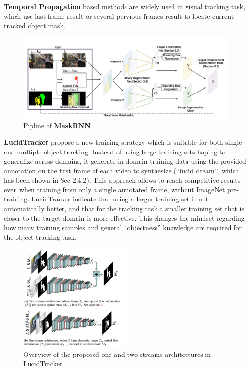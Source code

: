 \textbf{Temporal Propagation} based methods are widely used in visual tracking task\cite{LucidTracker}\cite{CTN}\cite{MaskRNN}, which use last frame result or several pervious frames result to locate current tracked object mask.


\begin{figure}[ht]
    \centering
    \includegraphics[width=\textwidth]{./figure/MaskRNN.png}
    \caption{Pipline of \textbf{MaskRNN}}
    \label{MaskRNN}
\end{figure}


\textbf{LucidTracker}\cite{LucidTracker} propose a new training strategy which is suitable for both single and multiple object tracking. Instead of using large training sets hoping to generalize across domains, it generate in-domain training data using the provided annotation on the first frame of each video to synthesize (``lucid dream'', which has been shown in Sec 2.4.2). This approach allows to reach competitive results even when training from only a single annotated frame, without ImageNet pre-training. LucidTracker indicate that using a larger training set is not automatically better, and that for the tracking task a smaller training set that is closer to the target domain is more effective. This changes the mindset regarding how many training samples and general ``objectness'' knowledge are required for the object tracking task.

\begin{figure}[ht]
    \centering
    \includegraphics[width=0.5\textwidth]{./figure/lucid_tracker.png}
    \caption{Overview of the proposed one and two streams architectures in LucidTracker}
    \label{lucid_tracker}
\end{figure}

